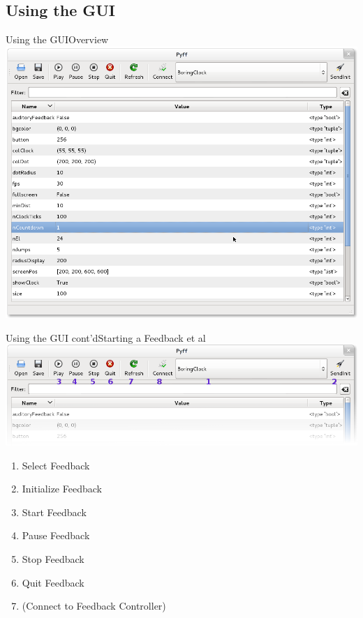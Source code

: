 \documentclass{beamer}
\begin{document}
\subsection{Using the GUI}
\begin{frame}{Using the GUI}{Overview}
    \includegraphics[width=0.9\linewidth]{gui}
\end{frame}

\begin{frame}{Using the GUI cont'd}{Starting a Feedback et al}
    \includegraphics[width=\linewidth]{gui_walkthrough}
    \begin{enumerate}
        \item Select Feedback
        \item Initialize Feedback
        \item Start Feedback
        \item Pause Feedback
        \item Stop Feedback
        \item Quit Feedback
        \item (Connect to Feedback Controller)
    \end{enumerate}
\end{frame}
\end{document}
